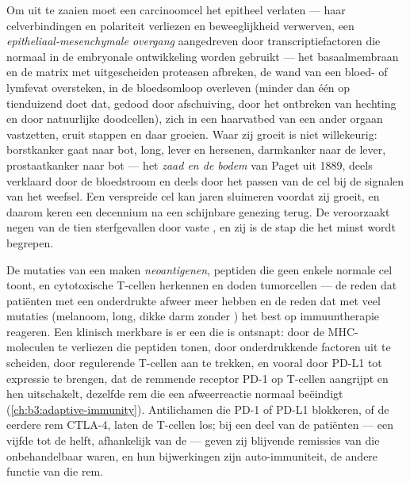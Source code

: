 \begin{definition}\label{def:b3:cancer-biology:metastasis}
Om uit te zaaien moet een carcinoomcel het epitheel verlaten --- haar
celverbindingen en polariteit verliezen en beweeglijkheid verwerven,
een \emph{epitheliaal-mesenchymale overgang} aangedreven door
transcriptiefactoren die normaal in de embryonale ontwikkeling worden
gebruikt --- het basaalmembraan en de matrix met uitgescheiden
proteasen afbreken, de wand van een bloed- of lymfevat oversteken, in
de bloedsomloop overleven (minder dan één op tienduizend doet dat,
gedood door afschuiving, door het ontbreken van hechting en door
natuurlijke doodcellen), zich in een haarvatbed van een ander orgaan
vastzetten, eruit stappen en daar groeien. Waar zij groeit is niet
willekeurig: borstkanker gaat naar bot, long, lever en hersenen,
darmkanker naar de lever, prostaatkanker naar bot --- het \emph{zaad en
de bodem} van Paget uit 1889, deels verklaard door de bloedstroom en
deels door het passen van de cel bij de signalen van het weefsel. Een
verspreide cel kan jaren sluimeren voordat zij groeit, en daarom keren
 een decennium na een schijnbare genezing terug. De 
veroorzaakt negen van de tien sterfgevallen door vaste , en zij
is de stap die het minst wordt begrepen.
\end{definition}

\begin{proposition}\label{prop:b3:cancer-biology:immune}
De mutaties van een  maken \emph{neoantigenen}, peptiden die geen
enkele normale cel toont, en cytotoxische T-cellen herkennen en doden
tumorcellen --- de reden dat patiënten met een onderdrukte afweer meer
 hebben en de reden dat  met veel mutaties (melanoom,
long, dikke darm zonder ) het best op immuuntherapie
reageren. Een klinisch merkbare  is er een die is ontsnapt: door
de MHC-moleculen te verliezen die peptiden tonen, door onderdrukkende
factoren uit te scheiden, door regulerende T-cellen aan te trekken, en
vooral door PD-L1 tot expressie te brengen, dat de remmende receptor
PD-1 op T-cellen aangrijpt en hen uitschakelt, dezelfde rem die een
afweerreactie normaal beëindigt
(\cref{ch:b3:adaptive-immunity}). Antilichamen die PD-1 of PD-L1
blokkeren, of de eerdere rem CTLA-4, laten de T-cellen los; bij een
deel van de patiënten --- een vijfde tot de helft, afhankelijk van de
 --- geven zij blijvende remissies van  die onbehandelbaar
waren, en hun bijwerkingen zijn auto-immuniteit, de andere functie van
die rem.
\end{proposition}

